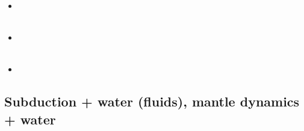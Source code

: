 \begin{scriptsize}
\begin{itemize}
\textcite{fegb19} \\
\item[\twothousandtwenty] 
\textcite{thsc20} \\
\textcite{rixu20} \\
\item[\twothousandtwentyone] 
\textcite{erhf21} \\
\textcite{lule21} \\
\item[\twothousandtwentytwo] 
\textcite{peli22} \\
\end{itemize}
\end{scriptsize}

\subsection{Subduction + water (fluids), mantle dynamics + water}

